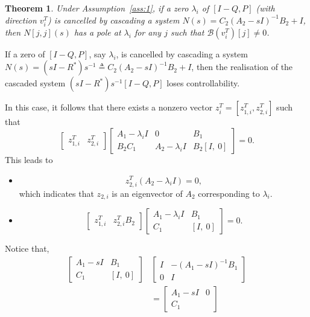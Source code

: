 \documentclass[twocolumn,12pt]{autart}
\theoremstyle{plain}
\newtheorem{theorem}{Theorem}
\newenvironment{proof}[1][Proof]{\begin{trivlist} \item[\hskip \labelsep {\bfseries #1}]}{\end{trivlist}}
\begin{document}
\begin{theorem}\label{thm:cancelz}
Under Assumption~\ref{ass:1}, if a zero  $\lambda_i$ of $[I-Q,P]$ (with direction $v_i^T$) is cancelled by cascading a system ${N}(s)={C}_2({A}_2-sI)^{-1}{B}_2+{I}$, then $N[j,j](s)$ has a pole at $\lambda_i$ for any $j$ such that $\mathcal{B}(v_i^T)[j]\neq0$.
\end{theorem}
\begin{proof}
If a zero of $[I-Q,P]$, say $\lambda_i$, is cancelled by cascading a system ${N}(s)=(s{I}-{R}^*)s^{-1}\triangleq {C}_2({A}_2-sI)^{-1}{B}_2+{I}$, then the realisation of the cascaded system $(s{I}-{R^*})s^{-1}[I-{Q},{P}]$ loses controllability. 

In this case, it follows that there exists a nonzero vector ${z}_i^T= [{z}_{1,i}^T, {z}_{2,i}^T]$ such that
$$\begin{bmatrix} {z}^T_{1,i}& {z}^T_{2,i} \end{bmatrix}\begin{bmatrix} {A}_1-\lambda_i{I} & {0}  & B_1 \\ {B}_2
  {C}_1 & {A}_2-\lambda_i{I} & B_2[I, ~0]
\end{bmatrix}=0.$$
This leads to 
\begin{itemize}
\item[1.] $${z}^T_{2,i}({A}_2-\lambda_i{I})=0,$$
which indicates that ${z}_{2,i}$ is an eigenvector of ${A}_2$ corresponding to $\lambda_i$. 
\item[2.] 
\begin{equation}\label{eq:temp}
\begin{bmatrix} {z}^T_{1,i}& {z}^T_{2,i}B_2 \end{bmatrix}\begin{bmatrix} {A}_1-\lambda_i{I} & B_1 \\ 
  {C}_1 & [I, ~0]
\end{bmatrix}=0.\end{equation}
\end{itemize}
Notice that, 
\begin{align*}
\begin{bmatrix} {A}_1-s{I} & {B}_1\\ {C}_1& [{I},~0]
\end{bmatrix}
&\begin{bmatrix} {I} & -({A}_1-s{I})^{-1}B_1 \\
0& {I}
\end{bmatrix}\\ 
&=\begin{bmatrix} {A}_1-s{I} & 0\\ C_1 &

\end{bmatrix}
\end{align*}
\end{proof}
\end{document}
